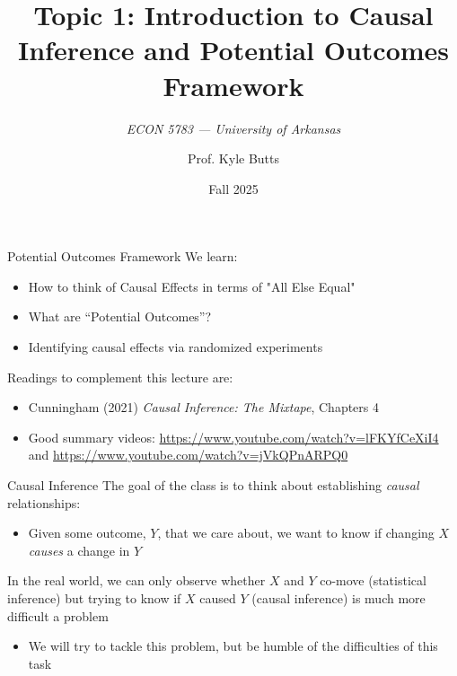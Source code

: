 \documentclass[aspectratio=169,t,11pt,table]{beamer}
\title{Topic 1: Introduction to Causal Inference and Potential Outcomes Framework}
\subtitle{\it  ECON 5783 — University of Arkansas}
\date{Fall 2025}
\author{Prof. Kyle Butts}
\begin{document}
\begin{frame}
  \maketitle

\end{frame}

\begin{frame}{Potential Outcomes Framework}
  We learn:
  \begin{itemize}
    \item How to think of Causal Effects in terms of "All Else Equal"
    \item What are ``Potential Outcomes''?
    \item Identifying causal effects via randomized experiments
  \end{itemize}

  \bigskip
  Readings to complement this lecture are:
  \begin{itemize}
    \item Cunningham (2021) \emph{Causal Inference: The Mixtape}, Chapters 4
    
    \item Good summary videos: \url{https://www.youtube.com/watch?v=lFKYfCeXiI4} and \url{https://www.youtube.com/watch?v=jVkQPnARPQ0}
  \end{itemize}
\end{frame}

\begin{frame}{Causal Inference}
  The goal of the class is to think about establishing \emph{causal} relationships:
  \begin{itemize}
    \item Given some outcome, $Y$, that we care about, we want to know if changing $X$ \emph{causes} a change in $Y$
  \end{itemize}
    
  \pause
  \bigskip
  In the real world, we can only observe whether $X$ and $Y$ co-move (\alert{statistical inference}) but trying to know if $X$ caused $Y$ (\alert{causal inference}) is much more difficult a problem
  \begin{itemize}
    \item We will try to tackle this problem, but be humble of the difficulties of this task
  \end{itemize}
\end{frame}
\end{document}
